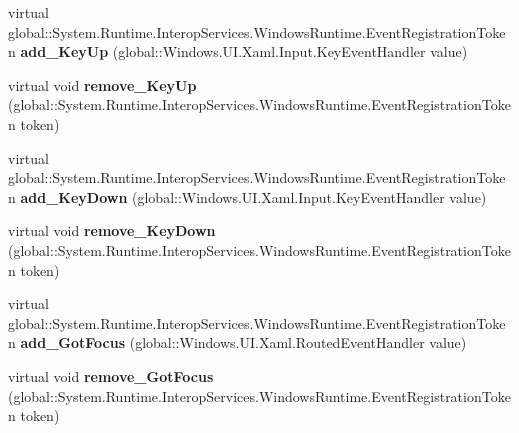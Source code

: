 \begin{DoxyCompactItemize}
\item 
\mbox{\label{class_windows_1_1_u_i_1_1_xaml_1_1_u_i_element_ae3fbd9d6083ca5ff6d54b03c98f3ddd0}} 
virtual global\+::\+System.\+Runtime.\+Interop\+Services.\+Windows\+Runtime.\+Event\+Registration\+Token {\bfseries add\+\_\+\+Key\+Up} (global\+::\+Windows.\+U\+I.\+Xaml.\+Input.\+Key\+Event\+Handler value)
\item 
\mbox{\label{class_windows_1_1_u_i_1_1_xaml_1_1_u_i_element_a9b0df5770c1290041beafa550462cc33}} 
virtual void {\bfseries remove\+\_\+\+Key\+Up} (global\+::\+System.\+Runtime.\+Interop\+Services.\+Windows\+Runtime.\+Event\+Registration\+Token token)
\item 
\mbox{\label{class_windows_1_1_u_i_1_1_xaml_1_1_u_i_element_a58b82f2b844e4c525c9caa9f4dea423b}} 
virtual global\+::\+System.\+Runtime.\+Interop\+Services.\+Windows\+Runtime.\+Event\+Registration\+Token {\bfseries add\+\_\+\+Key\+Down} (global\+::\+Windows.\+U\+I.\+Xaml.\+Input.\+Key\+Event\+Handler value)
\item 
\mbox{\label{class_windows_1_1_u_i_1_1_xaml_1_1_u_i_element_a20e6427c1bb47624dae8e067c2fcf806}} 
virtual void {\bfseries remove\+\_\+\+Key\+Down} (global\+::\+System.\+Runtime.\+Interop\+Services.\+Windows\+Runtime.\+Event\+Registration\+Token token)
\item 
\mbox{\label{class_windows_1_1_u_i_1_1_xaml_1_1_u_i_element_acf97b246d988b08971b2521c2500b00b}} 
virtual global\+::\+System.\+Runtime.\+Interop\+Services.\+Windows\+Runtime.\+Event\+Registration\+Token {\bfseries add\+\_\+\+Got\+Focus} (global\+::\+Windows.\+U\+I.\+Xaml.\+Routed\+Event\+Handler value)
\item 
\mbox{\label{class_windows_1_1_u_i_1_1_xaml_1_1_u_i_element_a969ce3d1998e0289e2292ad1e208096f}} 
virtual void {\bfseries remove\+\_\+\+Got\+Focus} (global\+::\+System.\+Runtime.\+Interop\+Services.\+Windows\+Runtime.\+Event\+Registration\+Token token)
\item 
\mbox{\label{class_windows_1_1_u_i_1_1_xaml_1_1_u_i_element_ac2967b5f0d4bd33c16e3b3b32e19b01a}} 

\end{DoxyCompactItemize}
